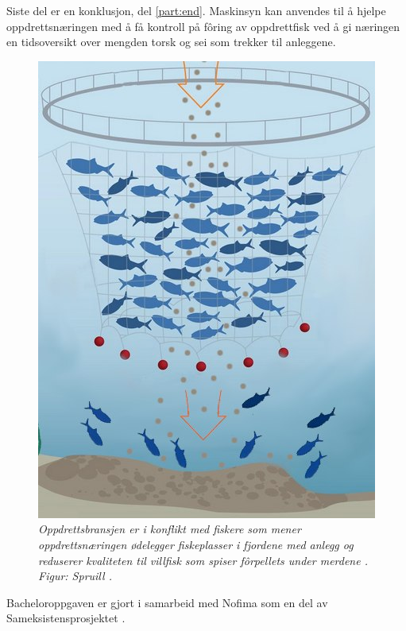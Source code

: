 Siste del er en konklusjon, del \ref{part:end}. Maskinsyn kan anvendes til å hjelpe oppdrettsnæringen med å få kontroll på fôring av oppdrettfisk ved å gi næringen en tidsoversikt over mengden torsk og sei som trekker til anleggene.

\begin{figure} 
\begin{center} 
\includegraphics[scale=0.7]{figures/merder-fisk}
\caption{\small \sl Oppdrettsbransjen er i konflikt med fiskere som mener oppdrettsnæringen ødelegger fiskeplasser i fjordene med anlegg og reduserer kvaliteten til villfisk som spiser fôrpellets under merdene \cite{Olsen m.fl. 2018}. Figur: Spruill \cite{Spruill 2011 s. 12}. \label{fig:anlegg}} 
\end{center} 
\end{figure} 

Bacheloroppgaven er gjort i samarbeid med Nofima som en del av Sameksistensprosjektet \cite{Robertsen 2020}.